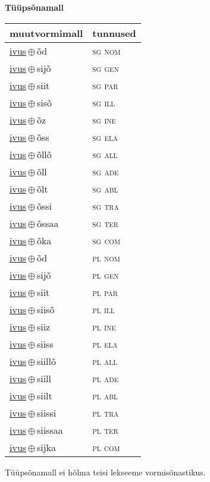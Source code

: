 

\vspace{3.5em}
\noindent \begin{minipage}{\textwidth}
\noindent \textbf{Tüüpsõnamall \,}\\

\begin{sideways}
\begin{tabular}{l l}
muutvormimall & tunnused \\
\hline
\underline{ivus}\,$\oplus$\,õd & \textsc{ sg nom } \\
\underline{ivus}\,$\oplus$\,sijõ & \textsc{ sg gen } \\
\underline{ivus}\,$\oplus$\,siit & \textsc{ sg par } \\
\underline{ivus}\,$\oplus$\,sisõ & \textsc{ sg ill } \\
\underline{ivus}\,$\oplus$\,õz & \textsc{ sg ine } \\
\underline{ivus}\,$\oplus$\,õss & \textsc{ sg ela } \\
\underline{ivus}\,$\oplus$\,õllõ & \textsc{ sg all } \\
\underline{ivus}\,$\oplus$\,õll & \textsc{ sg ade } \\
\underline{ivus}\,$\oplus$\,õlt & \textsc{ sg abl } \\
\underline{ivus}\,$\oplus$\,õssi & \textsc{ sg tra } \\
\underline{ivus}\,$\oplus$\,õssaa & \textsc{ sg ter } \\
\underline{ivus}\,$\oplus$\,õka & \textsc{ sg com } \\
\underline{ivus}\,$\oplus$\,õd & \textsc{ pl nom } \\
\underline{ivus}\,$\oplus$\,sijõ & \textsc{ pl gen } \\
\underline{ivus}\,$\oplus$\,siit & \textsc{ pl par } \\
\underline{ivus}\,$\oplus$\,siisõ & \textsc{ pl ill } \\
\underline{ivus}\,$\oplus$\,siiz & \textsc{ pl ine } \\
\underline{ivus}\,$\oplus$\,siiss & \textsc{ pl ela } \\
\underline{ivus}\,$\oplus$\,siillõ & \textsc{ pl all } \\
\underline{ivus}\,$\oplus$\,siill & \textsc{ pl ade } \\
\underline{ivus}\,$\oplus$\,siilt & \textsc{ pl abl } \\
\underline{ivus}\,$\oplus$\,siissi & \textsc{ pl tra } \\
\underline{ivus}\,$\oplus$\,siissaa & \textsc{ pl ter } \\
\underline{ivus}\,$\oplus$\,sijka & \textsc{ pl com } \\
\end{tabular}
\end{sideways}
\label{tab:tüüpsõnamall-ivusõd}

\end{minipage}

 
\vspace{1em}
\noindent Tüüpsõnamall  ei hõlma teisi lekseeme vormi\-sõnastikus.
